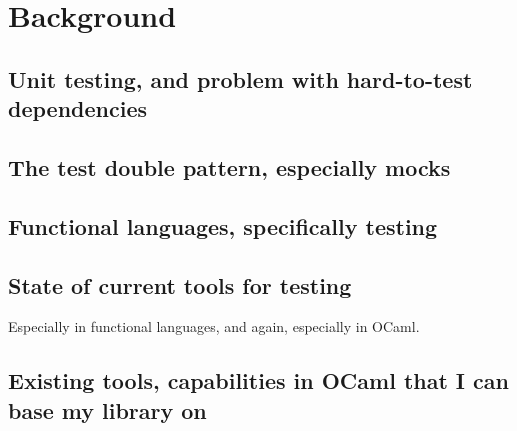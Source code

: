 \chapter{Background}

\section{Unit testing, and problem with hard-to-test dependencies}

\section{The test double pattern, especially mocks}

\section{Functional languages, specifically testing}

\section{State of current tools for testing}

Especially in functional languages, and again, especially in OCaml.

\section{Existing tools, capabilities in OCaml that I can base my library on}

